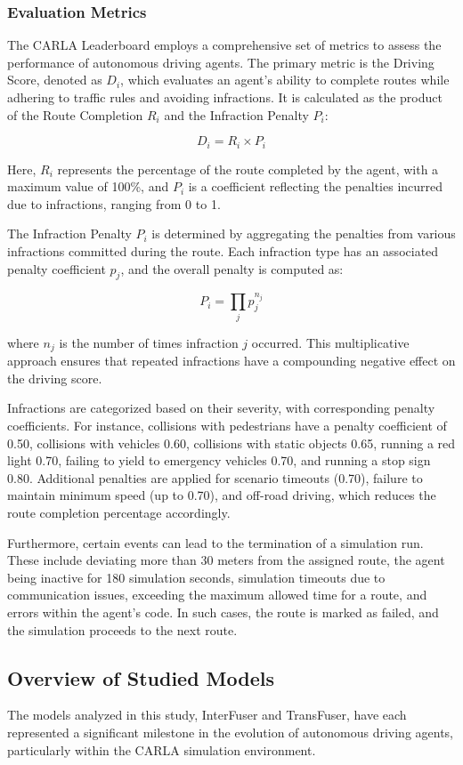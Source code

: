 \subsubsection{Evaluation Metrics}
The CARLA Leaderboard employs a comprehensive set of metrics to assess the performance of autonomous driving agents. The primary metric is the Driving Score, denoted as \( D_i \), which evaluates an agent's ability to complete routes while adhering to traffic rules and avoiding infractions. It is calculated as the product of the Route Completion \( R_i \) and the Infraction Penalty \( P_i \):

\[ D_i = R_i \times P_i \]

Here, \( R_i \) represents the percentage of the route completed by the agent, with a maximum value of 100\%, and \( P_i \) is a coefficient reflecting the penalties incurred due to infractions, ranging from 0 to 1.

The Infraction Penalty \( P_i \) is determined by aggregating the penalties from various infractions committed during the route. Each infraction type has an associated penalty coefficient \( p_j \), and the overall penalty is computed as:

\[ P_i = \prod_j p_j^{n_j} \]

where \( n_j \) is the number of times infraction \( j \) occurred. This multiplicative approach ensures that repeated infractions have a compounding negative effect on the driving score.

Infractions are categorized based on their severity, with corresponding penalty coefficients. For instance, collisions with pedestrians have a penalty coefficient of 0.50, collisions with vehicles 0.60, collisions with static objects 0.65, running a red light 0.70, failing to yield to emergency vehicles 0.70, and running a stop sign 0.80. Additional penalties are applied for scenario timeouts (0.70), failure to maintain minimum speed (up to 0.70), and off-road driving, which reduces the route completion percentage accordingly.

Furthermore, certain events can lead to the termination of a simulation run. These include deviating more than 30 meters from the assigned route, the agent being inactive for 180 simulation seconds, simulation timeouts due to communication issues, exceeding the maximum allowed time for a route, and errors within the agent's code. In such cases, the route is marked as failed, and the simulation proceeds to the next route.

\subsection{Overview of Studied Models}
The models analyzed in this study, InterFuser and TransFuser, have each represented a significant milestone in the evolution of autonomous driving agents, particularly within the CARLA simulation environment.

